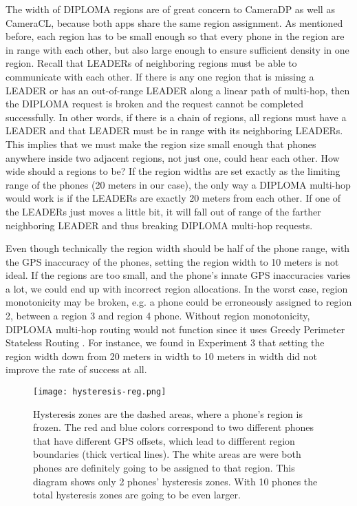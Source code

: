 The width of DIPLOMA regions are of great concern to CameraDP as well as CameraCL, because both apps share the same region assignment. As mentioned before, each region has to be small enough so that every phone in the region are in range with each other, but also large enough to ensure sufficient density in one region. Recall that LEADERs of neighboring regions must be able to communicate with each other. If there is any one region that is missing a LEADER or has an out-of-range LEADER along a linear path of multi-hop, then the DIPLOMA request is broken and the request cannot be completed successfully. In other words, if there is a chain of regions, all regions must have a LEADER and that LEADER must be in range with its neighboring LEADERs. This implies that we must make the region size small enough that phones anywhere inside two adjacent regions, not just one, could hear each other.  How wide should a regions to be? If the region widths are set exactly as the limiting range of the phones (20 meters in our case), the only way a DIPLOMA multi-hop would work is if the LEADERs are exactly 20 meters from each other. If one of the LEADERs just moves a little bit, it will fall out of range of the farther neighboring LEADER and thus breaking DIPLOMA multi-hop requests.

Even though technically the region width should be half of the phone range, with the GPS inaccuracy of the phones, setting the region width to 10 meters is not ideal. If the regions are too small, and the phone's innate GPS inaccuracies varies a lot, we could end up with incorrect region allocations. In the worst case, region monotonicity may be broken, e.g. a phone could be erroneously assigned to region 2, between a region 3 and region 4 phone. Without region monotonicity, DIPLOMA multi-hop routing would not function since it uses Greedy Perimeter Stateless Routing \cite{gpsr}. For instance, we found in Experiment 3 that setting the region width down from 20 meters in width to 10 meters in width did not improve the rate of success at all.

\begin{figure}[htb]
\begin{center}
\texttt{[image: hysteresis-reg.png]}
\caption{Hysteresis zones are the dashed areas, where a phone's region is frozen. The red and blue colors correspond to two different phones that have different GPS offsets, which lead to diffferent region boundaries (thick vertical lines). The white areas are were both phones are definitely going to be assigned to that region. This diagram shows only 2 phones' hysteresis zones. With 10 phones the total hysteresis zones are going to be even larger.}
\label{fig:hysteresis-png}
\end{center}
\end{figure}

